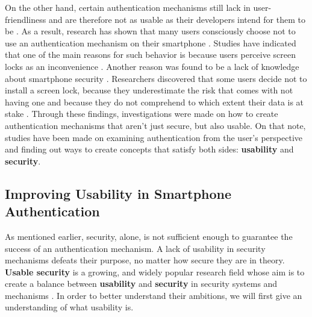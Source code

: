 On the other hand, certain authentication mechanisms still lack in user-friendliness and are therefore not as usable as their developers intend for them to be \cite{Schloeglhofer}. As a result, research has shown that many users consciously choose not to use an authentication mechanism on their smartphone \cite{ediss20251, Albayram:2017:BUL:3235924.3235929, Egelman:2014:YRL:2660267.2660273}. Studies have indicated that one of the main reasons for such behavior is because users perceive screen locks as an inconvenience \cite{Albayram:2017:BUL:3235924.3235929, ediss20251, harbach}. Another reason was found to be a lack of knowledge about smartphone security \cite{Albayram:2017:BUL:3235924.3235929, Adams:1999:UE:322796.322806}. Researchers discovered that some users decide not to install a screen lock, because they underestimate the risk that comes with not having one and because they do not comprehend to which extent their data is at stake \cite{Egelman:2014:YRL:2660267.2660273}. Through these findings, investigations were made on how to create authentication mechanisms that aren't just secure, but also usable. On that note, studies have been made on examining authentication from the user's perspective and finding out ways to create concepts that satisfy both sides: \textbf{usability} and \textbf{security}.  


\subsection{Improving Usability in Smartphone Authentication}

As mentioned earlier, security, alone, is not sufficient enough to guarantee the success of an authentication mechanism. A lack of usability in security mechanisms defeats their purpose, no matter how secure they are in theory. \textbf{Usable security} is a growing, and widely popular research field whose aim is to create a balance between \textbf{usability} and \textbf{security} in security systems and mechanisms \cite{Realpe-Munoz, anonymous}. In order to better understand their ambitions, we will first give an understanding of what usability is. \\

